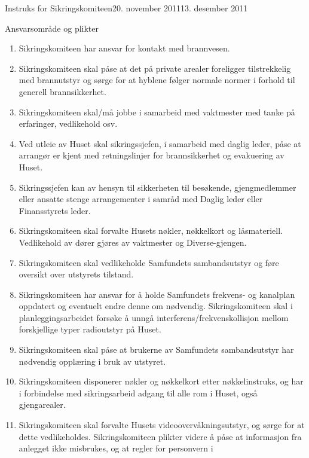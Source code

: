 \begin{instruks}{Instruks for Sikringskomiteen}{20. november 2011}{13. desember 2011}
\begin{instruksledd}{Ansvarsområde og plikter}
\begin{enumerate}
                sikringskomiteen til resten av Husets gjengmedlemmer. Sikringssjefen
                har ansvaret for brannøvelser.
            \item Sikringskomiteen har ansvar for kontakt med brannvesen.
            \item Sikringskomiteen skal påse at det på private arealer foreligger
                tilstrekkelig med brannutstyr og sørge for at
                hyblene følger normale normer i forhold til generell brannsikkerhet.
            \item Sikringskomiteen skal/må jobbe i samarbeid med vaktmester med tanke på
                erfaringer, vedlikehold osv.
            \item Ved utleie av Huset skal sikringssjefen, i samarbeid med daglig leder,
                påse at arrangør er kjent med
                retningslinjer for brannsikkerhet og evakuering av Huset.
            \item Sikringssjefen kan av hensyn til sikkerheten til besøkende,
                gjengmedlemmer eller ansatte stenge
                arrangementer i samråd med Daglig leder eller Finansstyrets leder.
            \item Sikringskomiteen skal forvalte Husets nøkler, nøkkelkort og låsmateriell.
                Vedlikehold av dører gjøres av
                vaktmester og Diverse-gjengen.
	    \item Sikringskomiteen skal vedlikeholde Samfundets sambandsutstyr og føre oversikt
		over utstyrets tilstand.
            \item Sikringskomiteen har ansvar for å holde Samfundets frekvens- og kanalplan
		oppdatert og eventuelt endre denne om nødvendig. Sikringskomiteen skal i
		planleggingsarbeidet forsøke å unngå interferens/frekvenskollisjon mellom
		forskjellige typer radioutstyr på Huset.
            \item Sikringskomiteen skal påse at brukerne av Samfundets sambandsutstyr har
		nødvendig opplæring i bruk av utstyret.
            \item Sikringskomiteen disponerer nøkler og nøkkelkort etter nøkkelinstruks,
                og har i forbindelse med
                sikringsarbeid adgang til alle rom i Huset, også gjengarealer.
            \item Sikringskomiteen skal forvalte Husets videoovervåkningsutstyr, og sørge
                for at dette vedlikeholdes.
                Sikringskomiteen plikter videre å påse at informasjon fra anlegget ikke
                misbrukes, og at regler for personvern i

\end{enumerate}
\end{instruksledd}
\end{instruks}
